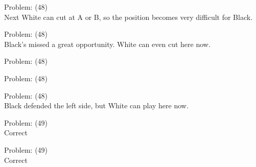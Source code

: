 \documentclass[11pt]{article}
\begin{document}
\begin{minipage}[t]{0.5\textwidth}
  {\centering
  
Problem: (48)\\
Next White can cut at A or B, so the position becomes very difficult for Black.\\
  }
\end{minipage}
\begin{minipage}[t]{0.5\textwidth}
  {\centering
  
Problem: (48)\\
Black's missed a great opportunity. White can even cut here now.\\
  }
\end{minipage}
\begin{minipage}[t]{0.5\textwidth}
  {\centering
  
Problem: (48)\\
  }
\end{minipage}
\begin{minipage}[t]{0.5\textwidth}
  {\centering
  
Problem: (48)\\
  }
\end{minipage}
\begin{minipage}[t]{0.5\textwidth}
  {\centering
  
Problem: (48)\\
Black defended the left side, but White can play here now.\\
  }
\end{minipage}
\begin{minipage}[t]{0.5\textwidth}
  {\centering
  
Problem: (49)\\
Correct\\
  }
\end{minipage}
\begin{minipage}[t]{0.5\textwidth}
  {\centering
  
Problem: (49)\\
Correct\\
  }
\end{minipage}
\end{document}
